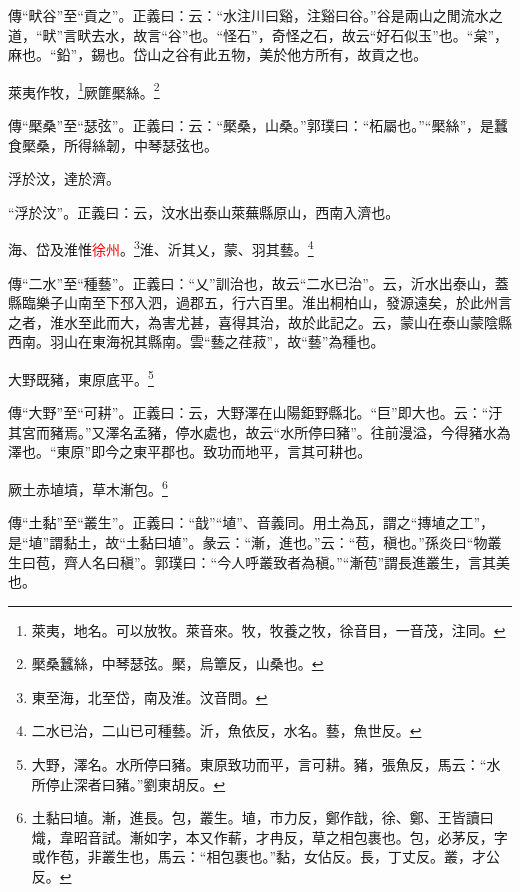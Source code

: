 {\noindent\zhuan{}\fzbyks 傳“畎谷”至“貢之”。正義曰：云：“水注川曰谿，注谿曰谷。”谷是兩山之閒流水之道，“畎”言畎去水，故言“谷”也。“怪石”，奇怪之石，故云“好石似玉”也。“枲”，麻也。“鉛”，錫也。岱山之谷有此五物，美於他方所有，故貢之也。 \par}

萊夷作牧，\footnote{萊夷，地名。可以放牧。萊音來。牧，牧養之牧，徐音目，一音茂，注同。}厥篚檿絲。\footnote{檿桑蠶絲，中琴瑟弦。檿，烏簟反，山桑也。}

{\noindent\zhuan{}\fzbyks 傳“檿桑”至“瑟弦”。正義曰：云：“檿桑，山桑。”郭璞曰：“柘屬也。”“檿絲”，是蠶食檿桑，所得絲韌，中琴瑟弦也。 \par}

浮於汶，達於濟。

{\noindent\shu{}\fzkt “浮於汶”。正義曰：云，汶水出泰山萊蕪縣原山，西南入濟也。 \par}

海、岱及淮惟\textcolor{red}{徐州}。\footnote{東至海，北至岱，南及淮。汶音問。}淮、沂其乂，蒙、羽其藝。\footnote{二水已治，二山已可種藝。沂，魚依反，水名。藝，魚世反。}

{\noindent\zhuan{}\fzbyks 傳“二水”至“種藝”。正義曰：“乂”訓治也，故云“二水已治”。云，沂水出泰山，蓋縣臨樂子山南至下邳入泗，過郡五，行六百里。淮出桐柏山，發源遠矣，於此州言之者，淮水至此而大，為害尤甚，喜得其治，故於此記之。云，蒙山在泰山蒙陰縣西南。羽山在東海祝其縣南。雲“藝之荏菽”，故“藝”為種也。 \par}

大野既豬，東原底平。\footnote{大野，澤名。水所停曰豬。東原致功而平，言可耕。豬，張魚反，馬云：“水所停止深者曰豬。”劉東胡反。}

{\noindent\zhuan{}\fzbyks 傳“大野”至“可耕”。正義曰：云，大野澤在山陽鉅野縣北。“巨”即大也。云：“汙其宮而豬焉。”又澤名孟豬，停水處也，故云“水所停曰豬”。往前漫溢，今得豬水為澤也。“東原”即今之東平郡也。致功而地平，言其可耕也。 \par}

厥土赤埴墳，草木漸包。\footnote{土黏曰埴。漸，進長。包，叢生。埴，市力反，鄭作戠，徐、鄭、王皆讀曰熾，韋昭音試。漸如字，本又作蔪，才冉反，草之相包裹也。包，必茅反，字或作苞，非叢生也，馬云：“相包裹也。”黏，女佔反。長，丁丈反。叢，才公反。}

{\noindent\zhuan{}\fzbyks 傳“土黏”至“叢生”。正義曰：“戠”“埴”、音義同。用土為瓦，謂之“摶埴之工”，是“埴”謂黏土，故“土黏曰埴”。彖云：“漸，進也。”云：“苞，稹也。”孫炎曰“物叢生曰苞，齊人名曰稹”。郭璞曰：“今人呼叢致者為稹。”“漸苞”謂長進叢生，言其美也。 \par}

